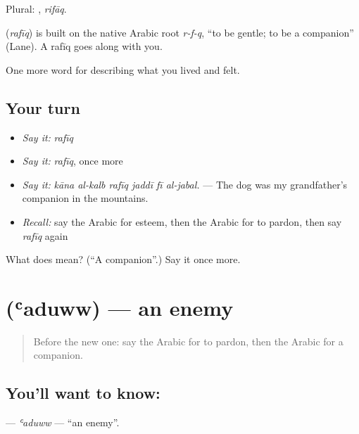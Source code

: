 Plural: , \emph{rifāq}.

\begin{cousinweb}
\textbf{} (\emph{rafīq}) is built on the native Arabic root \emph{r-f-q}, \textquotedblleft{}to be gentle; to be a companion\textquotedblright{} (Lane). A rafīq goes along with you.
\end{cousinweb}

\begin{grammarlens}[title={What you've built}]
One more word for describing what you lived and felt.
\end{grammarlens}

\subsection*{Your turn}
\begin{itemize}
\raggedright
  \item \emph{Say it:} \emph{rafīq}
  \item \emph{Say it:} \emph{rafīq}, once more
  \item \emph{Say it:} \emph{kāna al-kalb rafīq jaddī fī al-jabal.} — The dog was my grandfather's companion in the mountains.
  \item \emph{Recall:} say the Arabic for esteem, then the Arabic for to pardon, then say \emph{rafīq} again
\end{itemize}

\begin{tcolorbox}[breakable,colback=teal!4,colframe=teal!35!black,title={Before you move on}]
What does  mean? (\textquotedblleft{}A companion\textquotedblright{}.) Say it once more.
\end{tcolorbox}
\section[\texorpdfstring{\ar{عدو} (ʿaduww)}{عدو (ʿaduww)}]{ (ʿaduww) — an enemy}

\label{lesson:AR-C535-aduww}



\begin{quote}
Before the new one: say the Arabic for to pardon, then the Arabic for a companion.
\end{quote}

\subsection*{You'll want to know: }
\textbf{} — \emph{ʿaduww} — \textquotedblleft{}an enemy\textquotedblright{}.

